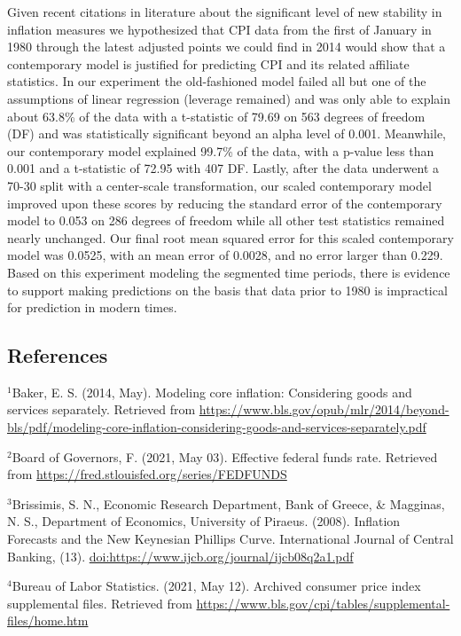 \documentclass[
]{article}
\begin{document}
Given recent citations in literature about the significant level of new
stability in inflation measures we hypothesized that CPI data from the
first of January in 1980 through the latest adjusted points we could
find in 2014 would show that a contemporary model is justified for
predicting CPI and its related affiliate statistics. In our experiment
the old-fashioned model failed all but one of the assumptions of linear
regression (leverage remained) and was only able to explain about 63.8\%
of the data with a t-statistic of 79.69 on 563 degrees of freedom (DF)
and was statistically significant beyond an alpha level of 0.001.
Meanwhile, our contemporary model explained 99.7\% of the data, with a
p-value less than 0.001 and a t-statistic of 72.95 with 407 DF. Lastly,
after the data underwent a 70-30 split with a center-scale
transformation, our scaled contemporary model improved upon these scores
by reducing the standard error of the contemporary model to 0.053 on 286
degrees of freedom while all other test statistics remained nearly
unchanged. Our final root mean squared error for this scaled
contemporary model was 0.0525, with an mean error of 0.0028, and no
error larger than 0.229. Based on this experiment modeling the segmented
time periods, there is evidence to support making predictions on the
basis that data prior to 1980 is impractical for prediction in modern
times.

\hypertarget{references}{%
\subsection{References}\label{references}}

\(^{1}\)Baker, E. S. (2014, May). Modeling core inflation: Considering
goods and services separately. Retrieved from
\url{https://www.bls.gov/opub/mlr/2014/beyond-bls/pdf/modeling-core-inflation-considering-goods-and-services-separately.pdf}

\(^{2}\)Board of Governors, F. (2021, May 03). Effective federal funds
rate. Retrieved from \url{https://fred.stlouisfed.org/series/FEDFUNDS}

\(^{3}\)Brissimis, S. N., Economic Research Department, Bank of Greece,
\& Magginas, N. S., Department of Economics, University of Piraeus.
(2008). Inflation Forecasts and the New Keynesian Phillips Curve.
International Journal of Central Banking, (13).
\url{doi:https://www.ijcb.org/journal/ijcb08q2a1.pdf}

\(^{4}\)Bureau of Labor Statistics. (2021, May 12). Archived consumer
price index supplemental files. Retrieved from
\url{https://www.bls.gov/cpi/tables/supplemental-files/home.htm}
\end{document}
